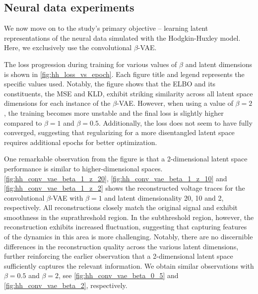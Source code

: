 \FloatBarrier
\subsection{Neural data experiments}

We now move on to the study's primary objective -- learning latent representations of the neural data simulated with the Hodgkin-Huxley model. Here, we exclusively use the convolutional $\beta$-VAE. 

The loss progression during training for various values of $\beta$ and latent dimensions is shown in \autoref{fig:hh_loss_vs_epoch}. Each figure title and legend represents the specific values used. Notably, the figure shows that the ELBO and its constituents, the MSE and KLD, exhibit striking similarity across all latent space dimensions for each instance of the $\beta$-VAE. However, when using a value of $\beta = 2$, the training becomes more unstable and the final loss is slightly higher compared to $\beta = 1$ and $\beta = 0.5$. Additionally, the loss does not seem to have fully converged, suggesting that regularizing for a more disentangled latent space requires additional epochs for better optimization. 

One remarkable observation from the figure is that a 2-dimensional latent space performance is similar to higher-dimensional spaces. \autoref{fig:hh_conv_vae_beta_1_z_20}, \ref{fig:hh_conv_vae_beta_1_z_10} and \ref{fig:hh_conv_vae_beta_1_z_2} shows the reconstructed voltage traces for the convolutional $\beta$-VAE with $\beta=1$ and latent dimensionality 20, 10 and 2, respectively. All reconstructions closely match the original signal and exhibit smoothness in the suprathreshold region. In the subthreshold region, however, the reconstruction exhibits increased fluctuation, suggesting that capturing features of the dynamics in this area is more challenging. Notably, there are no discernible differences in the reconstruction quality across the various latent dimensions, further reinforcing the earlier observation that a 2-dimensional latent space sufficiently captures the relevant information. We obtain similar observations with $\beta=0.5$ and $\beta=2$, see \autoref{fig:hh_conv_vae_beta_0_5} and \autoref{fig:hh_conv_vae_beta_2}, respectively.

